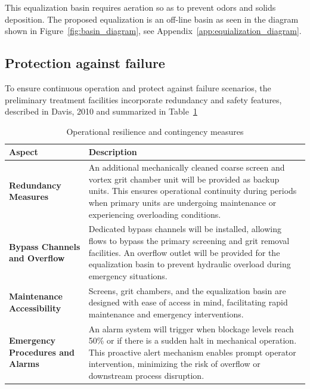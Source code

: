 \documentclass[11pt]{article}
\begin{document}
This equalization basin requires aeration so as to 
prevent odors and solids deposition. The proposed 
equalization is an off-line basin 
as seen in the diagram shown in Figure~\ref{fig:basin_diagram}, see 
Appendix~\ref{app:equialization_diagram}.



\subsection{Protection against failure}
\label{preliminary_treatment_protection}

To ensure continuous operation and protect against failure scenarios, 
the preliminary treatment facilities incorporate redundancy and safety 
features, described in Davis, 2010 and summarized in Table~\ref{tab:contingency_measures} 

\begin{table}[h]
\centering
\caption{Operational resilience and contingency measures \cite{davis2010water}}
\label{tab:contingency_measures}
\begin{tabularx}{\textwidth}{|l|X|}
\hline
\textbf{Aspect} & \textbf{Description} \\
\hline
\textbf{Redundancy Measures} & 
An additional mechanically cleaned coarse screen and vortex grit chamber unit will be provided as backup units. This ensures operational continuity during periods when primary units are undergoing maintenance or experiencing overloading conditions. \\[1em]
\hline
\textbf{Bypass Channels and Overflow} & 
Dedicated bypass channels will be installed, allowing flows to bypass the primary screening and grit removal facilities. An overflow outlet will be provided for the equalization basin to prevent hydraulic overload during emergency situations. \\[0.5em]
\hline
\textbf{Maintenance Accessibility} & 
Screens, grit chambers, and the equalization basin are designed with ease of access in mind, facilitating rapid maintenance and emergency interventions. \\
\hline
\textbf{Emergency Procedures and Alarms} & 
An alarm system will trigger when blockage levels reach 50\% or if there is a sudden halt in mechanical operation. This proactive alert mechanism enables prompt operator intervention, minimizing the risk of overflow or downstream process disruption. \\[0.5em]
\hline
\end{tabularx}
\end{table}
\end{document}

